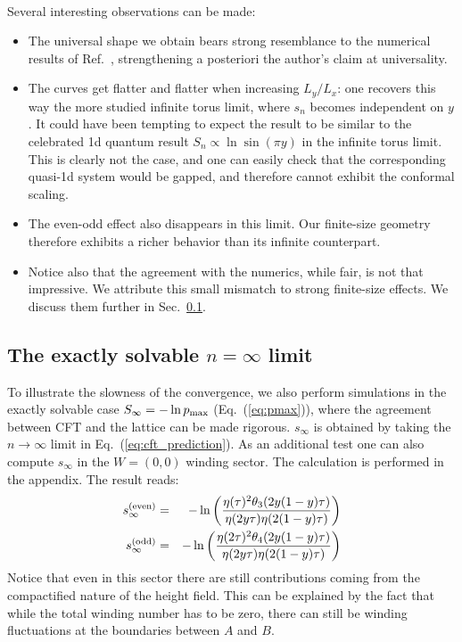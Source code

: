 \documentclass[11pt]{iopart}
\begin{document}
\paragraph{}
Several interesting observations can be made:
\begin{itemize}
 \item The universal shape we obtain bears strong resemblance to the numerical results of Ref.~\cite{Ju2012}, strengthening a posteriori the author's claim at universality.  
 \item The curves get flatter and flatter when increasing $L_y/L_x$: one recovers this way the more studied infinite torus limit, where $s_n$ becomes independent on $y$. It could have been tempting to expect the result to be similar to the celebrated 1d quantum result\cite{Cardy} $S_n\propto \ln\sin (\pi y)$ in the infinite torus limit. This is clearly not the case, and one can easily check that the corresponding quasi-1d system would be gapped, and therefore cannot exhibit the conformal scaling. 
 \item The even-odd effect also disappears in this limit. Our finite-size geometry therefore exhibits a richer behavior than its infinite counterpart.
 \item Notice also that the agreement with the numerics, while fair, is not that impressive. We attribute this small mismatch to strong finite-size effects. We discuss them further in Sec.~\ref{sec:exact}.
\end{itemize}
\subsection{The exactly solvable $n=\infty$ limit}
\label{sec:exact}
To illustrate the slowness of the convergence, we also perform simulations in the exactly solvable case $S_\infty=-\ln p_{\rm max}$ (Eq.~(\ref{eq:pmax})), where the agreement between CFT and the lattice can be made rigorous. $s_{\infty}$ is obtained by taking the $n\to \infty$ limit in Eq.~(\ref{eq:cft_prediction}). 
As an additional test one can also compute $s_\infty$ in the $W=(0,0)$ winding sector. The calculation is performed in the appendix. The result reads:
\begin{eqnarray}\label{eq:cft_w0}
 s_\infty^{\rm (even)}&=&-\ln \left(\frac{\eta(\tau)^2\theta_3(2y(1-y)\tau)}{\eta(2y\tau)\eta(2(1-y)\tau)}\right)\\\label{eq:cft_w0_odd}
 s_\infty^{\rm (odd)}&=&-\ln \left(\frac{\eta(2\tau)^2\theta_4(2y(1-y)\tau)}{\eta(2y\tau)\eta(2(1-y)\tau)}\right)
\end{eqnarray}
Notice that even in this sector there are still contributions coming from the compactified nature of the height field. This can be explained by the fact that while the total winding number has to be zero, there can still be winding fluctuations at the boundaries between $A$ and $B$. 
\end{document}
